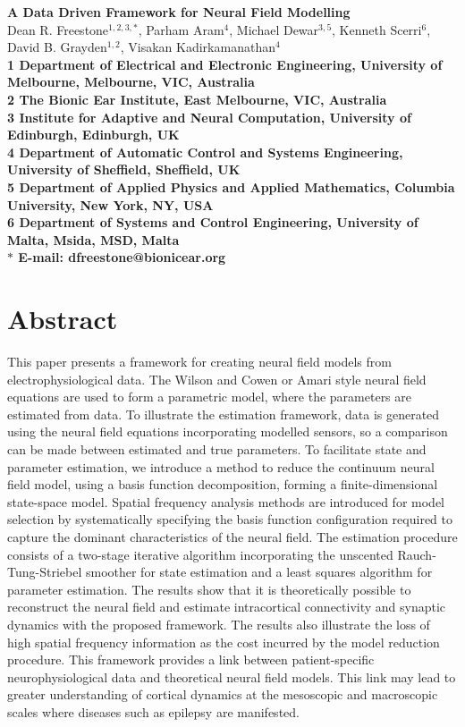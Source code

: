 \documentclass[10pt]{article}
\begin{document}
\begin{flushleft}
{\Large
\textbf{A Data Driven Framework for Neural Field Modelling}
}
\\
Dean R. Freestone$^{1,2,3,\ast}$, 
Parham Aram$^{4}$, 
Michael Dewar$^{3,5}$,
Kenneth Scerri$^{6}$,
David B. Grayden$^{1,2}$,
Visakan Kadirkamanathan$^{4}$
\\
\bf{1} Department of Electrical and Electronic Engineering, University of Melbourne, Melbourne, VIC, Australia
\\
\bf{2} The Bionic Ear Institute, East Melbourne, VIC, Australia
\\
\bf{3} Institute for Adaptive and Neural Computation, University of Edinburgh, Edinburgh, UK
\\
\bf{4} Department of Automatic Control and Systems Engineering, University of Sheffield, Sheffield, UK
\\
\bf{5} Department of Applied Physics and Applied Mathematics, Columbia University, New York, NY, USA
\\
\bf{6} Department of Systems and Control Engineering, University of Malta, Msida, MSD, Malta
\\
$\ast$ E-mail: dfreestone@bionicear.org
\end{flushleft}

\section*{Abstract}
This paper presents a framework for creating neural field models from electrophysiological data. The Wilson and Cowen or Amari style neural field equations are used to form a parametric model, where the parameters are estimated from data. To illustrate the estimation framework, data is generated using the neural field equations incorporating modelled sensors, so a comparison can be made between estimated and true parameters. To facilitate state and parameter estimation, we introduce a method to reduce the continuum neural field model, using a basis function decomposition, forming a finite-dimensional state-space model. Spatial frequency analysis methods are introduced for model selection by systematically specifying the basis function configuration required to capture the dominant characteristics of the neural field. The estimation procedure consists of a two-stage iterative algorithm incorporating the unscented Rauch-Tung-Striebel smoother for state estimation and a least squares algorithm for parameter estimation. The results show that it is theoretically possible to reconstruct the neural field and estimate intracortical connectivity and synaptic dynamics with the proposed framework. The results also illustrate the loss of high spatial frequency information as the cost incurred by the model reduction procedure. This framework provides a link between patient-specific neurophysiological data and theoretical neural field models. This link may lead to greater understanding of cortical dynamics at the mesoscopic and macroscopic scales where diseases such as epilepsy are manifested.
\end{document}
